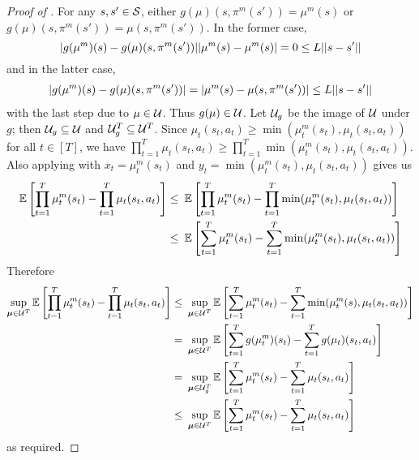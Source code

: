 \begin{proof}[Proof of ]
For any $s,s' \in \mathcal{S}$, either $g(\mu)(s,\pi^m(s')) = \mu^m(s)$ or $g(\mu)(s,\pi^m(s')) = \mu(s,\pi^m(s'))$. In the former case, 
\[
|g(\mu^m)(s) - g(\mu)(s,\pi^m(s'))| |\mu^m(s) - \mu^m(s)| = 0 \le L||s-s'||
\]
and in the latter case,
\begin{align*}
|g(\mu^m)(s) - g(\mu)(s,\pi^m(s'))| = |\mu^m(s) - \mu(s,\pi^m(s'))| \le L||s-s'||
\end{align*}
with the last step due to $\mu \in \mathcal{U}$. Thus $g(\mu) \in \mathcal{U}$. Let $\mathcal{U}_g$ be the image of $\mathcal{U}$ under $g$; then $\mathcal{U}_g \subseteq \mathcal{U}$ and $\mathcal{U}_g^T \subseteq \mathcal{U}^T$. Since $\mu_t(s_t,a_t) \ge \min(\mu_t^m(s_t), \mu_t(s_t,a_t))$ for all $t \in [T]$, we have $\prod_{t=1}^T \mu_t(s_t,a_t) \ge \prod_{t=1}^T \min(\mu_t^m(s_t), \mu_t(s_t,a_t))$. Also applying  with $x_t = \mu_t^m(s_t)$ and $y_t = \min(\mu_t^m(s_t), \mu_t(s_t,a_t))$ gives us
\begin{align*}
\operatorname*{\mathbb{E}}\left[\prod_{t=1}^T \mu_t^m(s_t) - \prod_{t=1}^T \mu_t(s_t, a_t)\right] \le&\ \operatorname*{\mathbb{E}}\left[\prod_{t=1}^T \mu_t^m(s_t) - \prod_{t=1}^T \min(\mu_t^m(s_t), \mu_t(s_t,a_t))\right]\\
\le&\ \operatorname*{\mathbb{E}}\left[\sum_{t=1}^T \mu_t^m(s_t) - \sum_{t=1}^T \min(\mu_t^m(s_t), \mu_t(s_t,a_t))\right]
\end{align*}
Therefore
\begin{align*}
\sup_{ \boldsymbol{\mu} \in \mathcal{U}^T}  \operatorname*{\mathbb{E}}\left[\prod_{t=1}^T \mu_t^m(s_t) - \prod_{t=1}^T \mu_t(s_t, a_t)\right] \le&\ \sup_{ \boldsymbol{\mu} \in \mathcal{U}^T}  \operatorname*{\mathbb{E}}\left[\sum_{t=1}^T \mu_t^m(s_t) - \sum_{t=1}^T \min(\mu_t^m(s), \mu_t(s_t, a_t))\right]\\
=&\ \sup_{ \boldsymbol{\mu} \in \mathcal{U}^T}  \operatorname*{\mathbb{E}}\left[\sum_{t=1}^T g(\mu_t^m)(s_t) - \sum_{t=1}^T g(\mu_t)(s_t, a_t)\right]\\
=&\ \sup_{ \boldsymbol{\mu} \in \mathcal{U}_g^T}  \operatorname*{\mathbb{E}}\left[\sum_{t=1}^T \mu_t^m(s_t) - \sum_{t=1}^T \mu_t(s_t, a_t)\right]\\
\le&\ \sup_{ \boldsymbol{\mu} \in \mathcal{U}^T}  \operatorname*{\mathbb{E}}\left[\sum_{t=1}^T \mu_t^m(s_t) - \sum_{t=1}^T \mu_t(s_t, a_t)\right]\\
\end{align*}
as required.
\end{proof}